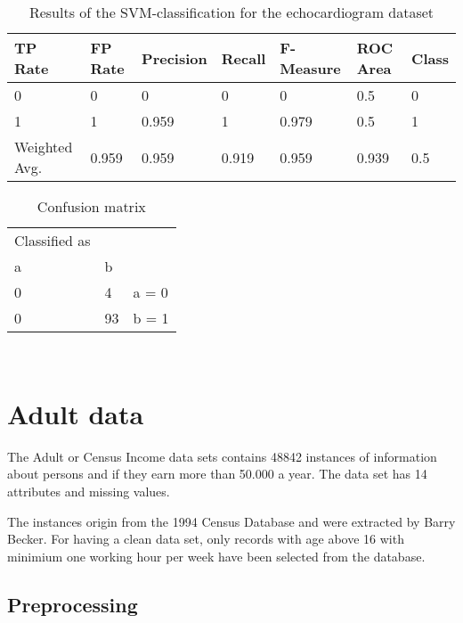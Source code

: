 \documentclass[paper=a4, fontsize=11pt]{scrartcl} %
\numberwithin{equation}{section} %
\numberwithin{figure}{section} %
\numberwithin{table}{section} %
\begin{document}
\begin{table}[h]
\centering
\begin{tabular}{|lllllll|}
	\hline
	TP Rate   			&FP Rate   &Precision   &Recall  &F-Measure   &ROC Area  &Class\\
	\hline
	0         			&0         &0         	&0       &  0         & 0.5      &0\\
  1         			&1         &0.959     	&1       &0.979       &	0.5       &1\\
  \hline
	Weighted Avg.		&0.959     &0.959      	&0.919   &0.959     	&0.939     &0.5\\
	\hline
\end{tabular}
\caption{Results of the SVM-classification for the echocardiogram dataset}
\end{table}

\vspace{6pt}

\begin{table}[h]
\centering
\begin{tabular}{|lll|}
	\hline
	Classified as	& &\\
	a		&	b & \\
	\hline
	0   & 4  	&  a = 0\\
  0   & 93 	&  b = 1\\
  \hline
\end{tabular}
\caption{Confusion matrix}
\end{table}



\begin{lstlisting}
  
\end{lstlisting}

\section{Adult data}

The Adult or Census Income data sets contains 48842 instances of information about persons and if they earn more than 50.000 a year. The data set has 14 attributes and missing values.

The instances origin from the 1994 Census Database and were extracted by Barry Becker. For having a clean data set, only records with age above 16 with minimium one working hour per week have been selected from the database.

\subsection{Preprocessing}
\end{document}
